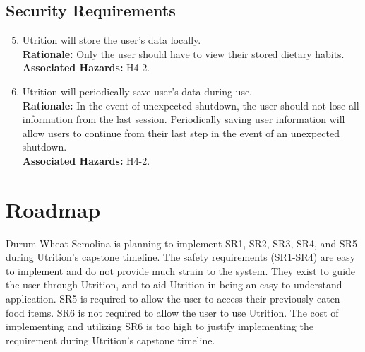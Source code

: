 \documentclass{article}
\begin{document}
\subsection{Security Requirements}
\begin{enumerate}[{SR}1.] 
	\setcounter{enumi}{4}
	
	\item Utrition will store the user’s data locally. \\
	\textbf{Rationale:} Only the user should have to view their stored dietary 
	habits. \\	
	\textbf{Associated Hazards:} H4-2.
	
	\item Utrition will periodically save user’s data during use. \\
	\textbf{Rationale:} In the event of unexpected shutdown, the user should 
	not lose all information from the last session. Periodically saving user 
	information will allow users to continue from their last step in the event 
	of an unexpected shutdown. \\	
	\textbf{Associated Hazards:} H4-2.
\end{enumerate}

\section{Roadmap}


Durum Wheat Semolina is planning to implement SR1, SR2, SR3, SR4, and SR5 during Utrition's capstone timeline. The safety requirements (SR1-SR4) are easy to implement and do not provide much strain to the system. They exist to guide the user through Utrition, and to aid Utrition in being an easy-to-understand application. SR5 is required to allow the user to access their previously eaten food items. SR6 is not required to allow the user to use Utrition. The cost of implementing and utilizing SR6 is too high to justify implementing the requirement during Utrition's capstone timeline.
	
\end{document}
